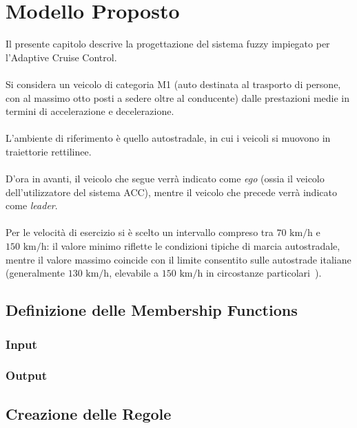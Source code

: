 \chapter{Modello Proposto}

Il presente capitolo descrive la progettazione del sistema fuzzy impiegato per l'Adaptive Cruise Control.  
\\\\
Si considera un veicolo di categoria M1 (auto destinata al trasporto di persone, con al massimo otto posti a sedere oltre al conducente)
dalle prestazioni medie in termini di accelerazione e decelerazione.  
\\\\
L'ambiente di riferimento è quello autostradale, in cui i veicoli si muovono in traiettorie rettilinee.  
\\\\
D'ora in avanti, il veicolo che segue verrà indicato come \emph{ego} (ossia il veicolo dell'utilizzatore del sistema ACC), 
mentre il veicolo che precede verrà indicato come \emph{leader}.  
\\\\
Per le velocità di esercizio si è scelto un intervallo compreso tra \(70\text{ km/h}\) e \(150\text{ km/h}\): 
il valore minimo riflette le condizioni tipiche di marcia autostradale, mentre il valore massimo coincide con il limite consentito 
sulle autostrade italiane (generalmente \(130\text{ km/h}\), elevabile a \(150\text{ km/h}\) in circostanze particolari~\cite{limite_autostrada_150}).  
 



\section{Definizione delle Membership Functions}
\subsection{Input}
\subsection{Output}

\section{Creazione delle Regole}